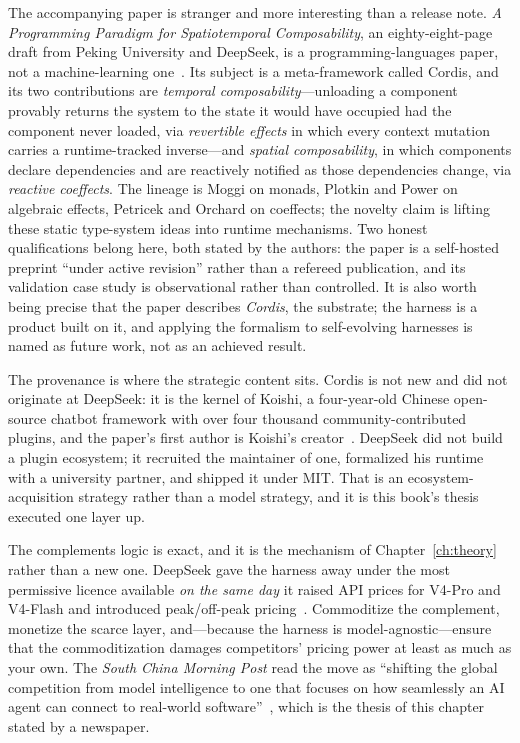 The accompanying paper is stranger and more interesting than a release note. \emph{A Programming Paradigm for Spatiotemporal Composability}, an eighty-eight-page draft from Peking University and DeepSeek, is a programming-languages paper, not a machine-learning one~\cite{cordis-paper}. Its subject is a meta-framework called Cordis, and its two contributions are \emph{temporal composability}---unloading a component provably returns the system to the state it would have occupied had the component never loaded, via \emph{revertible effects} in which every context mutation carries a runtime-tracked inverse---and \emph{spatial composability}, in which components declare dependencies and are reactively notified as those dependencies change, via \emph{reactive coeffects}. The lineage is Moggi on monads, Plotkin and Power on algebraic effects, Petricek and Orchard on coeffects; the novelty claim is lifting these static type-system ideas into runtime mechanisms. Two honest qualifications belong here, both stated by the authors: the paper is a self-hosted preprint ``under active revision'' rather than a refereed publication, and its validation case study is observational rather than controlled. It is also worth being precise that the paper describes \emph{Cordis}, the substrate; the harness is a product built on it, and applying the formalism to self-evolving harnesses is named as future work, not as an achieved result.

The provenance is where the strategic content sits. Cordis is not new and did not originate at DeepSeek: it is the kernel of Koishi, a four-year-old Chinese open-source chatbot framework with over four thousand community-contributed plugins, and the paper's first author is Koishi's creator~\cite{cordis-paper,dsh-36kr}. DeepSeek did not build a plugin ecosystem; it recruited the maintainer of one, formalized his runtime with a university partner, and shipped it under MIT. That is an ecosystem-acquisition strategy rather than a model strategy, and it is this book's thesis executed one layer up.

The complements logic is exact, and it is the mechanism of Chapter~\ref{ch:theory} rather than a new one. DeepSeek gave the harness away under the most permissive licence available \emph{on the same day} it raised API prices for V4-Pro and V4-Flash and introduced peak/off-peak pricing~\cite{dsh-venturebeat,deepseek-v4pro}. Commoditize the complement, monetize the scarce layer, and---because the harness is model-agnostic---ensure that the commoditization damages competitors' pricing power at least as much as your own. The \emph{South China Morning Post} read the move as ``shifting the global competition from model intelligence to one that focuses on how seamlessly an AI agent can connect to real-world software''~\cite{dsh-scmp}, which is the thesis of this chapter stated by a newspaper.

